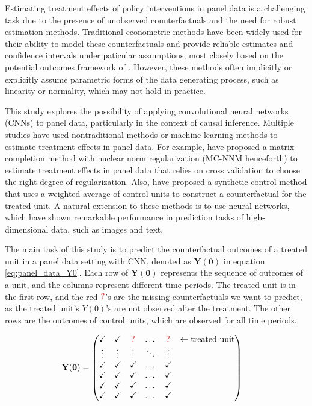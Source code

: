 
Estimating treatment effects of policy interventions in panel data is a challenging task due to the presence of unobserved counterfactuals and the need for robust estimation methods.
Traditional econometric methods have been widely used for their ability to model these counterfactuals and provide reliable estimates and confidence intervals under paticular assumptions, most closely based on the potential outcomes framework of \textcite{rubin1974estimating}.
However, these methods often implicitly or explicitly assume parametric forms of the data generating process, such as linearity or normality, which may not hold in practice.

This study explores the possibility of applying convolutional neural networks (CNNs) to panel data, particularly in the context of causal inference.
Multiple studies have used nontraditional methods 
or machine learning methods to estimate treatment effects in panel data.
For example, \textcite{athey2021matrix} have proposed a matrix completion method with nuclear norm regularization (MC-NNM henceforth) to estimate treatment effects in panel data that relies on cross validation to choose the
right degree of regularization.
Also, \textcite{abadie2010synthetic} have proposed a synthetic control method that uses 
a weighted average of control units to construct a counterfactual for the treated unit.
A natural extension to these methods is to use neural networks, which have shown remarkable performance in prediction tasks of high-dimensional data, such as images and text.


The main task of this study is to predict the counterfactual outcomes of a treated unit in a panel data setting with CNN, denoted 
as $\mathbf{Y(0)}$ in equation \eqref{eq:panel_data_Y0}.
Each row of $\mathbf{Y(0)}$ represents the sequence of outcomes of a unit, and the columns represent different time periods.
The treated unit is in the first row, and the red ${\color{red} ?}$'s are the missing counterfactuals we want to predict, as the treated unit's $Y(0)$'s are not observed after the treatment.
The other rows are the outcomes of control units, which are observed for all time periods.

\begin{align}
    	\mathbf{Y(0)}&=\begin{pmatrix}
		\checkmark  & \checkmark & {\color{red} ?}   & \dots & {\color{red} ?}  & \leftarrow{\text{treated unit}}\\
		\vdots   &  \vdots & \vdots &\ddots &\vdots& \\
        \checkmark & \checkmark & \checkmark  & \dots & \checkmark& \\
		\checkmark  & \checkmark & \checkmark   & \dots & \checkmark & \\
		\checkmark & \checkmark & \checkmark   & \dots & \checkmark & \\
		\checkmark & \checkmark & \checkmark   & \dots & \checkmark & 
		\end{pmatrix} 
        \label{eq:panel_data_Y0}
\end{align}


